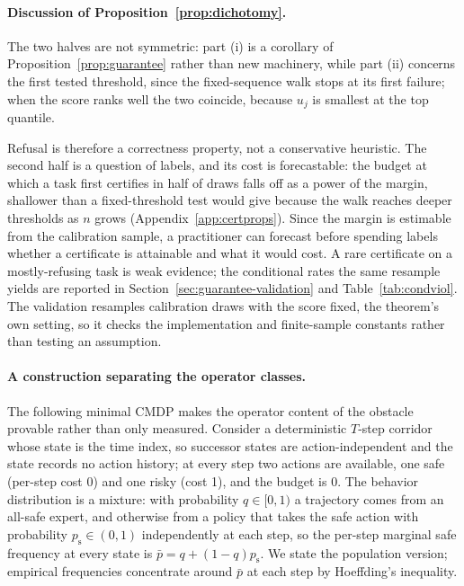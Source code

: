 \documentclass{article} %
\begin{document}
\paragraph{Discussion of Proposition~\ref{prop:dichotomy}.}
The two halves are not symmetric: part (i) is a corollary of Proposition~\ref{prop:guarantee} rather than new machinery, while part (ii) concerns the first tested threshold, since the fixed-sequence walk stops at its first failure; when the score ranks well the two coincide, because $u_j$ is smallest at the top quantile.

Refusal is therefore a correctness property, not a conservative heuristic. The second half is a question of labels, and its cost is forecastable: the budget at which a task first certifies in half of draws falls off as a power of the margin, shallower than a fixed-threshold test would give because the walk reaches deeper thresholds as $n$ grows (Appendix~\ref{app:certprops}). Since the margin is estimable from the calibration sample, a practitioner can forecast before spending labels whether a certificate is attainable and what it would cost. A rare certificate on a mostly-refusing task is weak evidence; the conditional rates the same resample yields are reported in Section~\ref{sec:guarantee-validation} and Table~\ref{tab:condviol}. The validation resamples calibration draws with the score fixed, the theorem's own setting, so it checks the implementation and finite-sample constants rather than testing an assumption.

\paragraph{A construction separating the operator classes.} The following minimal CMDP makes the operator content of the obstacle provable rather than only measured. Consider a deterministic $T$-step corridor whose state is the time index, so successor states are action-independent and the state records no action history; at every step two actions are available, one safe (per-step cost 0) and one risky (cost 1), and the budget is 0. The behavior distribution is a mixture: with probability $q \in [0, 1)$ a trajectory comes from an all-safe expert, and otherwise from a policy that takes the safe action with probability $p_{\mathrm{s}} \in (0, 1)$ independently at each step, so the per-step marginal safe frequency at every state is $\bar p = q + (1 - q) p_{\mathrm{s}}$. We state the population version; empirical frequencies concentrate around $\bar p$ at each step by Hoeffding's inequality.
\end{document}
